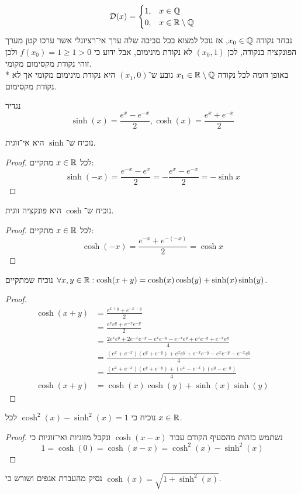 \Subquestion{}
\[
	\mathcal{D}(x) = \begin{cases}
		1, & x \in \mathbb{Q} \\
		0, & x \in \mathbb{R}\setminus\mathbb{Q}
	\end{cases}
\]
נבחר נקודה $x_0 \in \mathbb{Q}$, אז נוכל למצוא בכל סביבה שלה ערך אי־רציונלי אשר ערכו קטן מערך הפונקציה בנקודה, לכן $(x_0, 1)$ לא נקודת מינימום, אבל ידוע כי $f(x_0) = 1 \ge 1 > 0$ ולכן זוהי נקודת מקסימום מקומי. \\*
באופן דומה לכל נקודה $x_1 \in \mathbb{R}\setminus\mathbb{Q}$ נובע ש־$(x_1, 0)$ היא נקודת מינימום מקומי אך לא נקודת מקסימום.

\Question{}
נגדיר
\[
	\sinh(x) = \frac{e^x - e^{-x}}{2},
	\cosh(x) = \frac{e^x + e^{-x}}{2}
\]

\Subquestion{}
נוכיח ש־$\sinh$ היא אי־זוגית.
\begin{proof}
	לכל $x \in \mathbb{R}$ מתקיים:
	\[
		\sinh(-x) = \frac{e^{-x} - e^x}{2} = - \frac{e^x - e^{-x}}{2} = - \sinh x
	\]
\end{proof}

\Subquestion{}
נוכיח ש־$\cosh$ היא פונקציה זוגית.
\begin{proof}
	לכל $x \in \mathbb{R}$ מתקיים:
	\[
		\cosh(-x) = \frac{e^{-x} + e^{-(-x)}}{2} = \cosh x
	\]
\end{proof}

\Subquestion{}
נוכיח שמתקיים $\forall x, y \in \mathbb{R} : \cosh(x + y) = \cosh(x) \cosh(y) + \sinh(x) \sinh(y)$.
\begin{proof}
	\begin{align*}
		\cosh(x + y)
		& = \frac{e^{x + y} + e^{-x-y}}{2} \\
		& = \frac{e^x e^y + e^{-x} e^{-y}}{2} \\
		& = \frac{2e^x e^y + 2e^{-x} e^{-y} - e^x e^{-y} - e^{-x}e^y + e^x e^{-y} + e^{-x}e^y }{4} \\
		& = \frac{(e^x + e^{-x})(e^y + e^{-y}) + e^x e^y + e^{-x} e^{-y} - e^x e^{-y} - e^{-x}e^y }{4} \\
		& = \frac{(e^x + e^{-x})(e^y + e^{-y}) + (e^x - e^{-x})(e^y - e^{-y}) }{4} \\
		\cosh(x + y) & = \cosh(x) \cosh(y) + \sinh(x) \sinh(y)
	\end{align*}
\end{proof}

\Subquestion{}
נוכיח כי $\cosh^2(x) - \sinh^2(x) = 1$ לכל $x \in \mathbb{R}$.
\begin{proof}
	נשתמש בזהות מהסעיף הקודם עבור $\cosh(x - x)$ ונקבל מזוגיות ואי־זוגיות כי
	\[
		1 = \cosh(0) = \cosh(x - x)
		= \cosh^2(x) - \sinh^2(x)
	\]
\end{proof}
נסיק מהעברת אגפים ושורש כי $\cosh(x) = \sqrt{1 + \sinh^2(x)}$.

